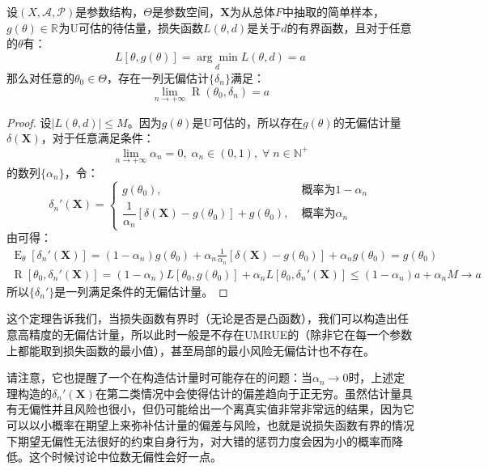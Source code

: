 \begin{theorem}
	设$(X,\mathscr{A},\mathscr{P})$是参数结构，$\Theta$是参数空间，$\mathbf{X}$为从总体$F$中抽取的简单样本，$g(\theta)\in\mathbb{R}^{}$为U可估的待估量，损失函数$L(\theta,d)$是关于$d$的有界函数，且对于任意的$\theta$有：
	\begin{equation*}
		L[\theta,g(\theta)]=\underset{d}{\arg\min}L(\theta,d)=a
	\end{equation*}
	那么对任意的$\theta_0\in\Theta$，存在一列无偏估计$\{\delta_n\}$满足：
	\begin{equation*}
		\lim_{n\to+\infty}\operatorname{R}(\theta_0,\delta_n)=a
	\end{equation*}
\end{theorem}
\begin{proof}
	设$|L(\theta,d)|\leqslant M$。因为$g(\theta)$是U可估的，所以存在$g(\theta)$的无偏估计量$\delta(\mathbf{X})$，对于任意满足条件：
	\begin{equation*}
		\lim_{n\to+\infty}\alpha_n=0,\;\alpha_n\in(0,1),\;\forall\;n\in\mathbb{N}^+
	\end{equation*}
	的数列$\{\alpha_n\}$，令：
	\begin{equation*}
		\delta_n'(\mathbf{X})=
		\begin{cases}
			g(\theta_0),\;&\text{概率为}1-\alpha_n \\
			\dfrac{1}{\alpha_n}[\delta(\mathbf{X})-g(\theta_0)]+g(\theta_0),\;&\text{概率为}\alpha_n
		\end{cases}
	\end{equation*}
	由可得：
	\begin{gather*}
		\operatorname{E}_{\theta}[\delta_n'(\mathbf{X})]=(1-\alpha_n)g(\theta_0)+\alpha_n\frac{1}{\alpha_n}[\delta(\mathbf{X})-g(\theta_0)]+\alpha_ng(\theta_0)=g(\theta_0) \\
		\operatorname{R}[\theta_0,\delta_n'(\mathbf{X})]=(1-\alpha_n)L[\theta_0,g(\theta_0)]+\alpha_nL[\theta_0,\delta_n'(\mathbf{X})]\leqslant(1-\alpha_n)a+\alpha_nM\to a
	\end{gather*}
	所以$\{\delta_n'\}$是一列满足条件的无偏估计量。
\end{proof}
\begin{note}
	这个定理告诉我们，当损失函数有界时（无论是否是凸函数），我们可以构造出任意高精度的无偏估计量，所以此时一般是不存在UMRUE的（除非它在每一个参数上都能取到损失函数的最小值），甚至局部的最小风险无偏估计也不存在。\par
	请注意，它也提醒了一个在构造估计量时可能存在的问题：当$\alpha_n\to0$时，上述定理构造的$\delta_n'(\mathbf{X})$在第二类情况中会使得估计的偏差趋向于正无穷。虽然估计量具有无偏性并且风险也很小，但仍可能给出一个离真实值非常非常远的结果，因为它可以以小概率在期望上来弥补估计量的偏差与风险，也就是说损失函数有界的情况下期望无偏性无法很好的约束自身行为，对大错的惩罚力度会因为小的概率而降低。这个时候讨论中位数无偏性会好一点。
\end{note}

